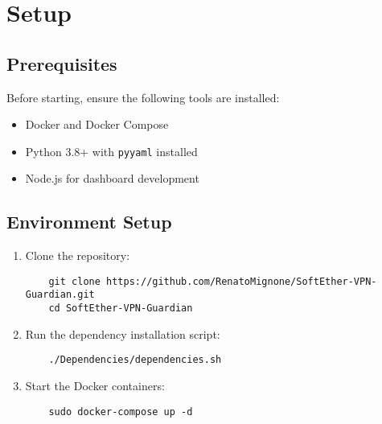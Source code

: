 \section{Setup}

\subsection{Prerequisites}
Before starting, ensure the following tools are installed:
\begin{itemize}
    \item Docker and Docker Compose
    \item Python 3.8+ with \texttt{pyyaml} installed
    \item Node.js for dashboard development
\end{itemize}

\subsection{Environment Setup}
\begin{enumerate}
    \item Clone the repository:
    \begin{verbatim}
    git clone https://github.com/RenatoMignone/SoftEther-VPN-Guardian.git
    cd SoftEther-VPN-Guardian
    \end{verbatim}
    \item Run the dependency installation script:
    \begin{verbatim}
    ./Dependencies/dependencies.sh
    \end{verbatim}
    \item Start the Docker containers:
    \begin{verbatim}
    sudo docker-compose up -d
    \end{verbatim}
\end{enumerate}
